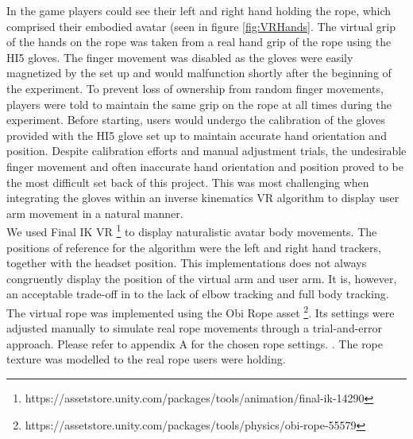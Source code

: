In the game players could see their left and right hand holding the rope, which comprised their embodied avatar (seen in figure \ref{fig:VRHands}. The virtual grip of the hands on the rope was taken from a real hand grip of the rope using the HI5 gloves. The finger movement was disabled as the gloves were easily magnetized by the set up and would malfunction shortly after the beginning of the experiment. To prevent loss of ownership from random finger movements, players were told to maintain the same grip on the rope at all times during the experiment. Before starting, users would undergo the calibration of the gloves provided with the HI5 glove set up to maintain accurate hand orientation and position. Despite calibration efforts and manual adjustment trials, the  undesirable finger movement and often inaccurate hand orientation and position proved to be the most difficult set back of this project. This was most challenging when integrating the gloves within an inverse kinematics VR algorithm to display user arm movement in a natural manner.
\\
We used Final IK VR \footnote{https://assetstore.unity.com/packages/tools/animation/final-ik-14290} to display naturalistic avatar body movements. The positions of reference for the algorithm were the left and right hand trackers, together with the headset position. 
This implementations does not always congruently display the position of the virtual arm and user arm. It is, however, an acceptable trade-off in to the lack of elbow tracking and full body tracking. 
The virtual rope was implemented using the Obi Rope asset \footnote{https://assetstore.unity.com/packages/tools/physics/obi-rope-55579}. Its settings were adjusted manually to simulate real rope movements through a trial-and-error approach. Please refer to appendix A for the chosen rope settings. . The rope texture was modelled to the real rope users were holding. 

